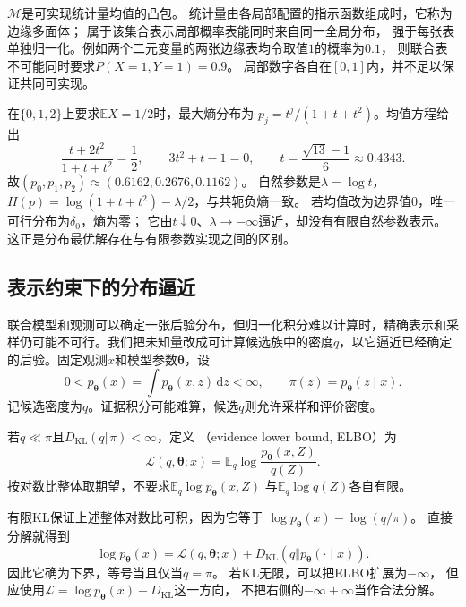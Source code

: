 \(\mathcal M\)是可实现统计量均值的凸包。
统计量由各局部配置的指示函数组成时，它称为边缘多面体；
属于该集合表示局部概率表能同时来自同一全局分布，
强于每张表单独归一化。例如两个二元变量的两张边缘表均令取值\(1\)的概率为\(0.1\)，
则联合表不可能同时要求\(P(X=1,Y=1)=0.9\)。
局部数字各自在\([0,1]\)内，并不足以保证共同可实现。

在\(\{0,1,2\}\)上要求\(\mathbb EX=1/2\)时，最大熵分布为
\(p_j=t^j/(1+t+t^2)\)。均值方程给出
\[
  \frac{t+2t^2}{1+t+t^2}=\frac12,\qquad
  3t^2+t-1=0,\qquad
  t=\frac{\sqrt{13}-1}{6}\approx0.4343.
\]
故\((p_0,p_1,p_2)\approx(0.6162,0.2676,0.1162)\)。
自然参数是\(\lambda=\log t\)，
\(H(p)=\log(1+t+t^2)-\lambda/2\)，与共轭负熵一致。
若均值改为边界值\(0\)，唯一可行分布为\(\delta_0\)，熵为零；
它由\(t\downarrow0\)、\(\lambda\to-\infty\)逼近，却没有有限自然参数表示。
这正是分布最优解存在与有限参数实现之间的区别。

\subsection{表示约束下的分布逼近}
\label{sec:information-elbo-approximation}

联合模型和观测可以确定一张后验分布，但归一化积分难以计算时，精确表示和采样仍可能不可行。我们把未知量改成可计算候选族中的密度\(q\)，以它逼近已经确定的后验。固定观测\(x\)和模型参数\(\bm\theta\)，设
\[
  0<p_{\bm\theta}(x)=\int p_{\bm\theta}(x,z)\,\mathrm dz<\infty,
  \qquad
  \pi(z)=p_{\bm\theta}(z\mid x).
\]
记候选密度为\(q\)。证据积分可能难算，候选\(q\)则允许采样和评价密度。

\begin{definition}[证据下界]
\label{def:information-elbo}
若\(q\ll\pi\)且\(D_{\mathrm{KL}}(q\Vert\pi)<\infty\)，定义
（evidence lower bound, ELBO）为
\[
  \mathcal L(q,\bm\theta;x)
  =\mathbb E_q\log\frac{p_{\bm\theta}(x,Z)}{q(Z)}.
\]
按对数比整体取期望，不要求\(\mathbb E_q\log p_{\bm\theta}(x,Z)\)
与\(\mathbb E_q\log q(Z)\)各自有限。
\end{definition}

有限KL保证上述整体对数比可积，因为它等于
\(\log p_{\bm\theta}(x)-\log(q/\pi)\)。
直接分解就得到
\begin{equation}
  \log p_{\bm\theta}(x)
  =\mathcal L(q,\bm\theta;x)+D_{\mathrm{KL}}(q\Vert p_{\bm\theta}(\cdot\mid x)).
  \label{eq:information-elbo-decomposition}
\end{equation}
因此它确为下界，等号当且仅当\(q=\pi\)。
若KL无限，可以把ELBO扩展为\(-\infty\)，
但应使用\(\mathcal L=\log p_{\bm\theta}(x)-D_{\mathrm{KL}}\)这一方向，
不把右侧的\(-\infty+\infty\)当作合法分解。


